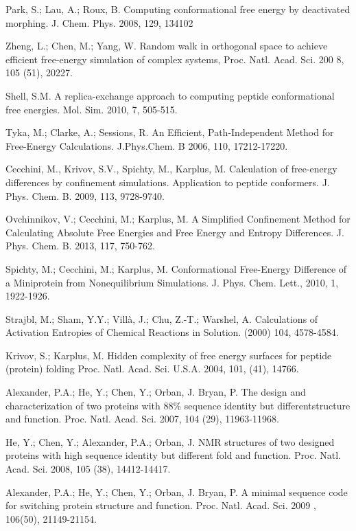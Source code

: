 \documentclass[12pt]{article}
\begin{document}
\begin{thebibliography}{99}
Park, S.; Lau, A.; Roux, B. Computing conformational free energy by deactivated morphing. J. Chem. Phys. 2008, 129, 134102

Zheng, L.; Chen, M.; Yang, W. Random walk in orthogonal space to achieve efficient free-energy simulation of complex systems, Proc. Natl. Acad. Sci. 200
8, 105 (51), 20227.

Shell, S.M. A replica-exchange approach to computing peptide conformational free energies. Mol. Sim. 2010, 7, 505-515.

Tyka, M.; Clarke, A.; Sessions, R. An Efficient, Path-Independent Method for Free-Energy Calculations. J.Phys.Chem. B 2006, 110, 17212-17220.

Cecchini, M., Krivov, S.V., Spichty, M., Karplus, M. Calculation of free-energy differences by confinement simulations. Application to peptide conformers. J. Phys. Chem. B. 2009, 113, 9728-9740.

Ovchinnikov, V.; Cecchini, M.; Karplus, M. A Simplified Confinement Method for Calculating Absolute Free Energies
and Free Energy and Entropy Differences. J. Phys. Chem. B. 2013, 117, 750-762.

Spichty, M.; Cecchini, M.; Karplus, M. Conformational Free-Energy Difference of a Miniprotein from Nonequilibrium
Simulations. J. Phys. Chem. Lett., 2010, 1, 1922-1926.

Strajbl, M.; Sham, Y.Y.; Villà, J.; Chu, Z.-T.; Warshel, A. Calculations of Activation Entropies of Chemical Reactions
in Solution. (2000) 104, 4578-4584.

Krivov, S.; Karplus, M. Hidden complexity of free energy surfaces for peptide (protein) folding Proc. Natl. Acad. Sci. U.S.A. 2004, 101, (41), 14766.

Alexander, P.A.; He, Y.; Chen, Y.; Orban, J. Bryan, P. The design and characterization of two proteins with $88 \%$ sequence identity but differentstructure and function. Proc. Natl. Acad. Sci. 2007, 104 (29), 11963-11968.

He, Y.; Chen, Y.; Alexander, P.A.; Orban, J. NMR structures of two designed proteins with high sequence identity but different fold and function. Proc. Natl. Acad. Sci. 2008, 105 (38), 14412-14417.

Alexander, P.A.; He, Y.; Chen, Y.; Orban, J. Bryan, P. A minimal sequence code for switching protein structure and function. Proc. Natl. Acad. Sci. 2009
, 106(50), 21149-21154.


\end{thebibliography}
\end{document}
